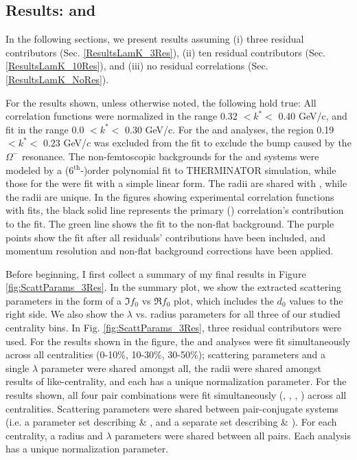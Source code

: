 \documentclass[/home/jesse/Analysis/FemtoAnalysis/AnalysisNotes/AnalysisNoteJBuxton.tex]{subfiles}
\begin{document}
\subsection{Results: \LamKs and \LamKpm}
\label{ResultsLamK}

In the following sections, we present results assuming (i) three residual contributors (Sec. \ref{ResultsLamK_3Res}), (ii) ten residual contributors (Sec. \ref{ResultsLamK_10Res}), and (iii) no residual correlations (Sec. \ref{ResultsLamK_NoRes}).

For the results shown, unless otherwise noted, the following hold true:
All correlation functions were normalized in the range 0.32 $< k^{*} <$ 0.40 GeV/c, and fit in the range 0.0 $< k^{*} <$ 0.30 GeV/c.
For the \LamKchM and \ALamKchP analyses, the region 0.19 $< k^{*} <$ 0.23 GeV/$c$ was excluded from the fit to exclude the bump caused by the $\Omega^{-}$ resonance.
The non-femtoscopic backgrounds for the \LamKchP and \LamKchM systems were modeled by a (6$^{\mathrm{th}}$-)order polynomial fit to THERMINATOR simulation, while those for the \LamKs were fit with a simple linear form.
The \LamKchPALamKchM radii are shared with \LamKchMALamKchP, while the \LamKsALamKs radii are unique.
In the figures showing experimental correlation functions with fits, the black solid line represents the primary (\LamK) correlation's contribution to the fit.
The green line shows the fit to the non-flat background.  
The purple points show the fit after all residuals' contributions have been included, and momentum resolution and non-flat background corrections have been applied.


Before beginning, I first collect a summary of my final results in Figure \ref{fig:ScattParams_3Res}.  
In the summary plot, we show the extracted scattering parameters in the form of a $\Im f_{0}$ vs $\Re f_{0}$ plot, which includes the $d_{0}$ values to the right side.  
We also show the $\lambda$ vs. radius parameters for all three of our studied centrality bins.  
In Fig. \ref{fig:ScattParams_3Res}, three residual contributors were used.
For the \LamKs results shown in the figure, the \LamKs and \ALamKs analyses were fit simultaneously across all centralities (0-10\%, 10-30\%, 30-50\%); scattering parameters and a single $\lambda$ parameter were shared amongst all, the radii were shared amongst results of like-centrality, and each has a unique normalization parameter.  
For the \LamKpm results shown, all four pair combinations were fit simultaneously (\LamKchP, \ALamKchM, \LamKchM, \ALamKchP) across all centralities.  
Scattering parameters were shared between pair-conjugate systems (i.e. a parameter set describing \LamKchP \& \ALamKchM, and a separate set describing \LamKchM \& \ALamKchP).  
For each centrality, a radius and $\lambda$ parameters were shared between all pairs.  Each analysis has a unique normalization parameter.
\end{document}
